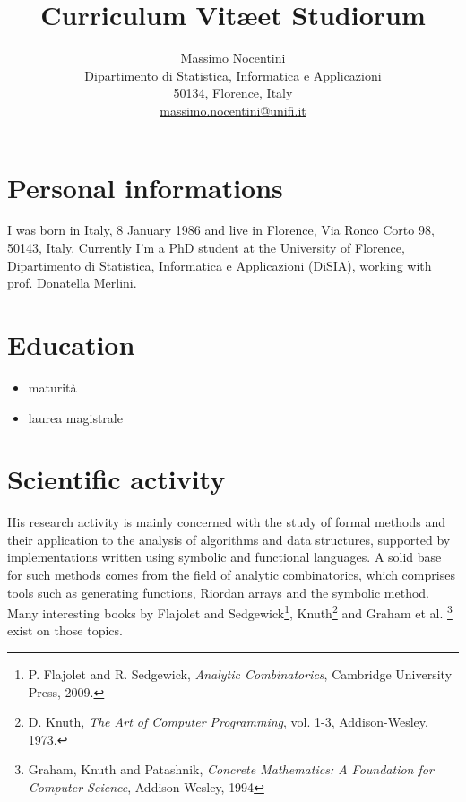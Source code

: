 \documentclass[10pt,a4paper]{scrartcl}
\begin{document}
    \title{Curriculum Vit\ae et Studiorum}

    \author{Massimo Nocentini\\ 
        \small{Dipartimento di Statistica, Informatica e Applicazioni}\\
        \small{50134, Florence, Italy}\\
        \small{\url{massimo.nocentini@unifi.it}}
        }

    \maketitle

    \section{Personal informations}
    
    I was born in Italy, 8 January 1986 and live in Florence, Via Ronco Corto 98,
    50143, Italy. Currently I'm a PhD student at the University of Florence, 
    Dipartimento di Statistica, Informatica e Applicazioni (DiSIA), working
    with prof. Donatella Merlini.

    \section{Education}
    \begin{itemize}
        \item maturit\`a
        \item laurea magistrale
    \end{itemize}

    \section{Scientific activity}
    
    His research activity is mainly concerned with the study of 
    formal methods and their application to the analysis of algorithms and data structures, 
    supported by implementations written using symbolic and functional languages.
    A solid base for such methods comes from the field of analytic combinatorics, 
    which comprises tools such as generating functions, Riordan arrays and the symbolic method. Many
    interesting books by Flajolet and Sedgewick\footnote{P. Flajolet and R.
    Sedgewick, \emph{Analytic Combinatorics}, Cambridge University Press, 2009.},
    Knuth\footnote{D. Knuth, \emph{The Art of Computer Programming}, vol.  1-3,
    Addison-Wesley, 1973.} and Graham et al. \footnote{Graham, Knuth and Patashnik,
    \emph{Concrete Mathematics: A Foundation for Computer Science}, Addison-Wesley,
    1994} exist on those topics. 
\end{document}
